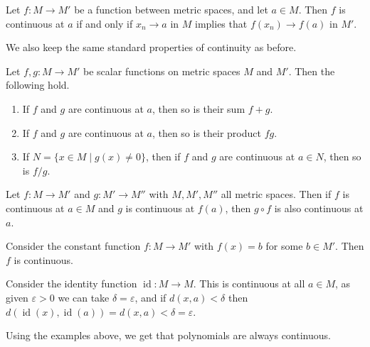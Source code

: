 \documentclass[a4paper]{scrartcl}
\begin{document}
\begin{proposition}
    Let $f: M \rightarrow M'$ be a function between metric spaces, and let $a \in M$. 
    Then $f$ is continuous at $a$ if and only if $x_n \rightarrow a$ in $M$ implies that $f(x_n) \rightarrow f(a)$ in $M'$.
\end{proposition}

We also keep the same standard properties of continuity as before.

\begin{proposition}
	Let $f, g: M \rightarrow M'$ be scalar functions on metric spaces $M$ and $M'$. Then the following hold.
	\begin{enumerate}[label=(\roman*)]
		\item If $f$ and $g$ are continuous at $a$, then so is their sum $f + g$.
		\item If $f$ and $g$ are continuous at $a$, then so is their product $fg$.
		\item If $N = \{x \in M \mid g(x)\neq 0\}$, then if $f$ and $g$ are continuous at $a \in N$, then so is $f/g$.
	\end{enumerate}
\end{proposition}

\begin{proposition}
	Let $f: M \rightarrow M'$ and $g: M' \rightarrow M''$ with $M, M', M''$ all metric spaces. Then if $f$ is continuous at $a \in M$ and $g$ is continuous at $f(a)$, then $g \circ f$ is also continuous at $a$.
\end{proposition}

\begin{example}
    Consider the constant function $f: M \rightarrow M'$ with $f(x) = b$ for some $b \in M'$. Then $f$ is continuous.
\end{example}

\begin{example}
    Consider the identity function $\operatorname{id}: M \rightarrow M$. This is continuous at all $a \in M$, as given $\varepsilon > 0$ we can take $\delta = \varepsilon$, and if $d(x, a) < \delta$ then $d(\operatorname{id}(x), \operatorname{id}(a)) = d(x, a) < \delta = \varepsilon$.
\end{example}

\begin{example}[Polynomials]
    Using the examples above, we get that polynomials are always continuous.
\end{example}
\end{document}
